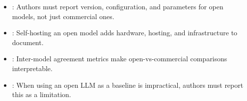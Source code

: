 \begin{itemize}[label=$\rightarrow$]
    \item \seemodelversion: Authors must report version, configuration, and parameters for open models, not just commercial ones.
    \item \seedesign: Self-hosting an open model adds hardware, hosting, and infrastructure to document.
    \item \seebenchmarksmetrics: Inter-model agreement metrics make open-vs-commercial comparisons interpretable.
    \item \seelimitationsmitigations: When using an open LLM as a baseline is impractical, authors must report this as a limitation.
\end{itemize}

